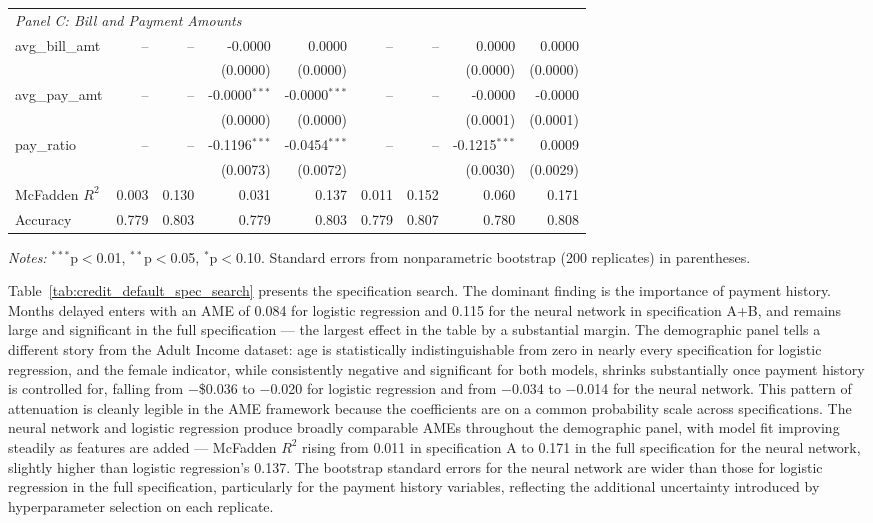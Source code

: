 \documentclass[12pt]{article}
\begin{document}
\begin{table}[htbp]
{\begin{threeparttable}
\begin{tabular}{lrrrrrrrr}
					\midrule
					\multicolumn{9}{l}{\textit{Panel C: Bill and Payment Amounts}} \\
					\quad avg\_bill\_amt & -- & -- & -0.0000 & 0.0000 & -- & -- & 0.0000 & 0.0000 \\
					&  &  & (0.0000) & (0.0000) &  &  & (0.0000) & (0.0000) \\
					\quad avg\_pay\_amt & -- & -- & -0.0000$^{***}$ & -0.0000$^{***}$ & -- & -- & -0.0000 & -0.0000 \\
					&  &  & (0.0000) & (0.0000) &  &  & (0.0001) & (0.0001) \\
					\quad pay\_ratio & -- & -- & -0.1196$^{***}$ & -0.0454$^{***}$ & -- & -- & -0.1215$^{***}$ & 0.0009 \\
					&  &  & (0.0073) & (0.0072) &  &  & (0.0030) & (0.0029) \\
					\midrule
					McFadden $R^2$ & 0.003 & 0.130 & 0.031 & 0.137 & 0.011 & 0.152 & 0.060 & 0.171 \\
					Accuracy & 0.779 & 0.803 & 0.779 & 0.803 & 0.779 & 0.807 & 0.780 & 0.808 \\
					\bottomrule
				\end{tabular}
				\begin{tablenotes}
					\footnotesize
					\item \textit{Notes:} $^{***}$p$<$0.01, $^{**}$p$<$0.05, $^{*}$p$<$0.10. Standard errors from nonparametric bootstrap (200 replicates) in parentheses.
				\end{tablenotes}
			\end{threeparttable}
		}%
	\end{table}
	
	Table~\ref{tab:credit_default_spec_search} presents the specification search. The dominant finding is the importance of payment history. Months delayed enters with an AME of 0.084 for logistic regression and 0.115 for the neural network in specification A+B, and remains large and significant in the full specification --- the largest effect in the table by a substantial margin. The demographic panel tells a different story from the Adult Income dataset: age is statistically indistinguishable from zero in nearly every specification for logistic regression, and the female indicator, while consistently negative and significant for both models, shrinks substantially once payment history is controlled for, falling from $-$\$0.036 to $-$0.020 for logistic regression and from $-$0.034 to $-$0.014 for the neural network. This pattern of attenuation is cleanly legible in the AME framework because the coefficients are on a common probability scale across specifications. The neural network and logistic regression produce broadly comparable AMEs throughout the demographic panel, with model fit improving steadily as features are added --- McFadden $R^2$ rising from 0.011 in specification A to 0.171 in the full specification for the neural network, slightly higher than logistic regression's 0.137. The bootstrap standard errors for the neural network are wider than those for logistic regression in the full specification, particularly for the payment history variables, reflecting the additional uncertainty introduced by hyperparameter selection on each replicate.
	
\end{document}
